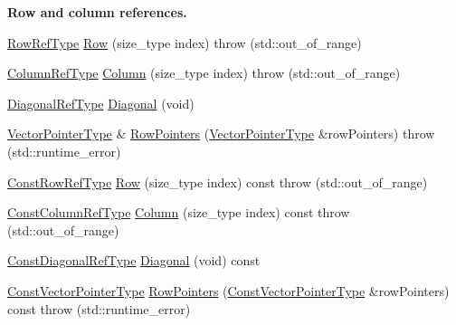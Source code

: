 \begin{Indent}{\bf Row and column references.}\par
\begin{DoxyCompactItemize}
\item 
\hyperlink{classvct_dynamic_const_matrix_base_a15b845e745a76559d730ecef10a991b7}{Row\+Ref\+Type} \hyperlink{classvct_dynamic_matrix_base_adb64c6d6c8f9b9d4aafb2d9c6a49cf4a}{Row} (size\+\_\+type index)  throw (std\+::out\+\_\+of\+\_\+range)
\item 
\hyperlink{classvct_dynamic_const_matrix_base_a232026578d12a51aa5228dee998b5663}{Column\+Ref\+Type} \hyperlink{classvct_dynamic_matrix_base_ac4911101f666e7cd410180e8c4ee2a70}{Column} (size\+\_\+type index)  throw (std\+::out\+\_\+of\+\_\+range)
\item 
\hyperlink{classvct_dynamic_const_matrix_base_a2773e894d2ce8aa7a479eeecc535ac33}{Diagonal\+Ref\+Type} \hyperlink{classvct_dynamic_matrix_base_a104a9164f09eee0e18a107a417021ae9}{Diagonal} (void)
\item 
\hyperlink{classvct_dynamic_const_matrix_base_aa3fdaf7217ea2667db03af719c3371c4}{Vector\+Pointer\+Type} \& \hyperlink{classvct_dynamic_matrix_base_a89086ef2a61ef8ba4f5ee1ec084c1581}{Row\+Pointers} (\hyperlink{classvct_dynamic_const_matrix_base_aa3fdaf7217ea2667db03af719c3371c4}{Vector\+Pointer\+Type} \&row\+Pointers)  throw (std\+::runtime\+\_\+error)
\item 
\hyperlink{classvct_dynamic_const_matrix_base_a42a300cb1afd5f0602ba5c2d7d9cc40b}{Const\+Row\+Ref\+Type} \hyperlink{classvct_dynamic_matrix_base_a951f9d281652ded8c7a7f295a05321fe}{Row} (size\+\_\+type index) const   throw (std\+::out\+\_\+of\+\_\+range)
\item 
\hyperlink{classvct_dynamic_const_matrix_base_ac8caf37f979246b1ae99d6e6876879e0}{Const\+Column\+Ref\+Type} \hyperlink{classvct_dynamic_matrix_base_a33bda20e269dd7e9e55da3a5dbf0fe58}{Column} (size\+\_\+type index) const   throw (std\+::out\+\_\+of\+\_\+range)
\item 
\hyperlink{classvct_dynamic_const_matrix_base_aa497314340719c9e70a4991d3f306d7e}{Const\+Diagonal\+Ref\+Type} \hyperlink{classvct_dynamic_matrix_base_a7a871918a880bb3dd95fa333b97c8774}{Diagonal} (void) const 
\item 
\hyperlink{classvct_dynamic_const_matrix_base_ae4eb1369d9d05fdf98786c5583834e73}{Const\+Vector\+Pointer\+Type} \hyperlink{classvct_dynamic_matrix_base_a08e9785b34adc674e05036f90943c883}{Row\+Pointers} (\hyperlink{classvct_dynamic_const_matrix_base_ae4eb1369d9d05fdf98786c5583834e73}{Const\+Vector\+Pointer\+Type} \&row\+Pointers) const   throw (std\+::runtime\+\_\+error)
\end{DoxyCompactItemize}
\end{Indent}
